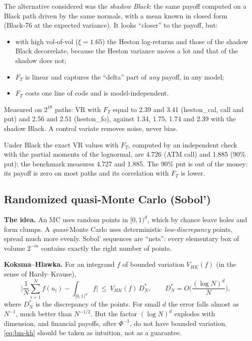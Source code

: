 \begin{perche}[title={\texorpdfstring{Why $F_T$ beats the ``shadow Black''}{Why F\_T beats the shadow Black}}]
The alternative considered was the \emph{shadow Black}: the same payoff computed on a Black path driven by the same
normals, with a mean known in closed form (Black-76 at the expected variance). It looks ``closer'' to the payoff, but:
\begin{itemize}
\item with high vol-of-vol ($\xi=1.65$) the Heston log-returns and those of the shadow Black decorrelate, because the
Heston variance moves a lot and that of the shadow does not;
\item $F_T$ is linear and captures the ``delta'' part of \emph{any} payoff, in any model;
\item $F_T$ costs one line of code and is model-independent.
\end{itemize}
Measured on $2^{18}$ paths: VR with $F_T$ equal to 2.39 and 3.41 (heston\_cal, call and put) and 2.56 and 2.51
(heston\_fo), against 1.34, 1.75, 1.74 and 2.39 with the shadow Black. A control variate removes noise, never bias.
\end{perche}

Under Black the exact VR values with $F_T$, computed by an independent check with the partial moments of the
lognormal, are 4.726 (ATM call) and 1.885 (90\% put); the benchmark measures 4.727 and 1.885. The 90\% put is out of
the money: its payoff is zero on most paths and its correlation with $F_T$ is lower.

\subsection{Randomized quasi-Monte Carlo (Sobol')}
\label{sec:bm-rqmc}
\textbf{The idea.} An MC uses random points in $[0,1)^d$, which by chance leave holes and form clumps. A
\emph{quasi}-Monte Carlo uses deterministic \emph{low-discrepancy} points, spread much more evenly. Sobol' sequences
are ``nets'': every elementary box of volume $2^{-m}$ contains exactly the right number of points.

\textbf{Koksma--Hlawka.} For an integrand $f$ of bounded variation $V_{HK}(f)$ (in the sense of Hardy--Krause),
\begin{equation}\label{eq:bm-kh}
\Big|\frac1N\sum_{i=1}^Nf(u_i)-\int_{[0,1)^d}f\Big|\ \le\ V_{HK}(f)\,D_N^*,
\qquad D_N^*=O\Big(\frac{(\log N)^d}{N}\Big),
\end{equation}
where $D_N^*$ is the discrepancy of the points. For small $d$ the error falls almost as $N^{-1}$, much better than
$N^{-1/2}$. But the factor $(\log N)^d$ explodes with dimension, and financial payoffs, after $\Phi^{-1}$, do not have
bounded variation. \eqref{eq:bm-kh} should be taken as intuition, not as a guarantee.

